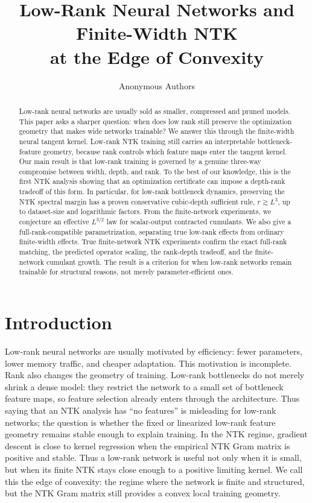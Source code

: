 \documentclass{article}
\title{Low-Rank Neural Networks and Finite-Width NTK\\
at the Edge of Convexity}
\author{Anonymous Authors}
\begin{document}
\maketitle

\begin{abstract}
Low-rank neural networks are usually sold as smaller, compressed and pruned models. This paper asks a sharper question: when does low rank still preserve the optimization geometry that makes wide networks trainable? We answer this through the finite-width neural tangent kernel. Low-rank NTK training still carries an interpretable bottleneck-feature geometry, because rank controls which feature maps enter the tangent kernel. Our main result is that low-rank training is governed by a genuine three-way compromise between width, depth, and rank. To the best of our knowledge, this is the first NTK analysis showing that an optimization certificate can impose a depth-rank tradeoff of this form. In particular, for low-rank bottleneck dynamics, preserving the NTK spectral margin has a proven conservative cubic-depth sufficient rule, \(r \gtrsim L^{3}\), up to dataset-size and logarithmic factors. From the finite-network experiments, we conjecture an effective \(L^{3/2}\) law for scalar-output contracted cumulants. We also give a full-rank-compatible parametrization, separating true low-rank effects from ordinary finite-width effects. True finite-network NTK experiments confirm the exact full-rank matching, the predicted operator scaling, the rank-depth tradeoff, and the finite-network cumulant growth. The result is a criterion for when low-rank networks remain trainable for structural reasons, not merely parameter-efficient ones.
\end{abstract}

\section{Introduction}
Low-rank neural networks are usually motivated by efficiency: fewer parameters, lower memory traffic, and cheaper adaptation. This motivation is incomplete. Rank also changes the geometry of training. Low-rank bottlenecks do not merely shrink a dense model: they restrict the network to a small set of bottleneck feature maps, so feature selection already enters through the architecture. Thus saying that an NTK analysis has ``no features'' is misleading for low-rank networks; the question is whether the fixed or linearized low-rank feature geometry remains stable enough to explain training. In the NTK regime, gradient descent is close to kernel regression when the empirical NTK Gram matrix is positive and stable. Thus a low-rank network is useful not only when it is small, but when its finite NTK stays close enough to a positive limiting kernel. We call this the edge of convexity: the regime where the network is finite and structured, but the NTK Gram matrix still provides a convex local training geometry.
\end{document}
